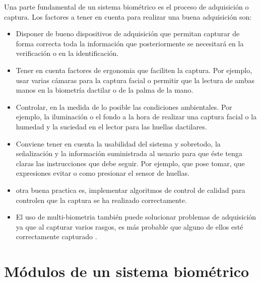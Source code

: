 Una parte fundamental de un sistema biométrico es el proceso de adquisición o \gls{captura}. Los factores a tener en cuenta para realizar una buena adquisición son:
\begin{itemize}
    \item 
    Disponer de bueno dispositivos de adquisición que permitan capturar de forma correcta toda la información que posteriormente se necesitará en la verificación o en la identificación.
    \item
    Tener en cuenta factores de \gls{ergonomia} que faciliten la \gls{captura}. Por ejemplo, usar varias cámaras para la \gls{captura} \gls{facial} o permitir que la lectura de ambas manos en la biometría dactilar o de la palma de la mano.
    \item
    Controlar, en la medida de lo posible las condiciones ambientales. Por ejemplo, la iluminación o el fondo a la hora de realizar una \gls{captura} facial o la humedad y la suciedad en el lector para las huellas dactilares.
    \item
    Conviene tener en cuenta la \gls{usabilidad} del sistema y sobretodo, la señalización y la información suministrada al usuario para que éste tenga claras las instrucciones que debe seguir. Por ejemplo, que pose tomar, que expresiones evitar o como presionar el sensor de huellas.
    \item
    otra buena practica es, implementar algoritmos de control de calidad para controlen que la \gls{captura} se ha realizado correctamente.
    \item
    El uso de \gls{multi-biometria} también puede solucionar problemas de adquisición ya que al capturar varios rasgos, es más probable que alguno de ellos esté correctamente capturado \cite{jain2007handbook} \cite{snelick2003multimodal} \cite{jain2004multibiometric}.  
\end{itemize}


\section{Módulos de un sistema biométrico}\label{sec:ModulosSistemasBiometricos}

